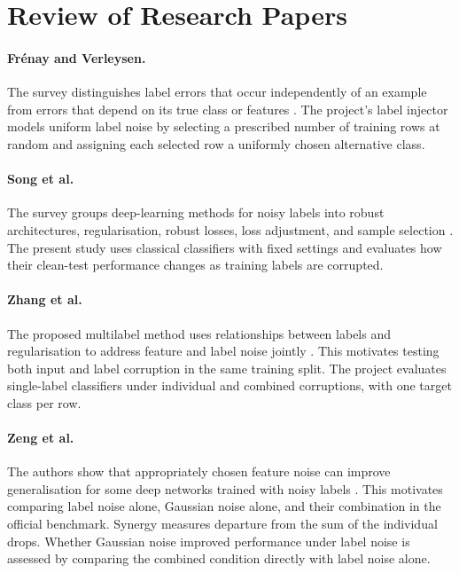 \section{Review of Research Papers}
\paragraph{Fr\'enay and Verleysen.}
The survey distinguishes label errors that occur independently of an example from errors that depend on its true class or features \cite{frenay2014classification}. The project's label injector models uniform label noise by selecting a prescribed number of training rows at random and assigning each selected row a uniformly chosen alternative class.

\paragraph{Song et al.}
The survey groups deep-learning methods for noisy labels into robust architectures, regularisation, robust losses, loss adjustment, and sample selection \cite{song2023survey}. The present study uses classical classifiers with fixed settings and evaluates how their clean-test performance changes as training labels are corrupted.

\paragraph{Zhang et al.}
The proposed multilabel method uses relationships between labels and regularisation to address feature and label noise jointly \cite{zhang2020hybrid}. This motivates testing both input and label corruption in the same training split. The project evaluates single-label classifiers under individual and combined corruptions, with one target class per row.

\paragraph{Zeng et al.}
The authors show that appropriately chosen feature noise can improve generalisation for some deep networks trained with noisy labels \cite{zeng2025feature}. This motivates comparing label noise alone, Gaussian noise alone, and their combination in the official benchmark. Synergy measures departure from the sum of the individual drops. Whether Gaussian noise improved performance under label noise is assessed by comparing the combined condition directly with label noise alone.

